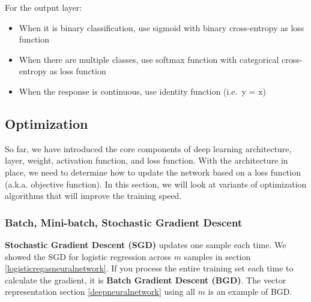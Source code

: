 \documentclass[
  12pt,
]{krantz}
\providecommand{\tightlist}{%
  \setlength{\itemsep}{0pt}\setlength{\parskip}{0pt}}
\begin{document}
For the output layer:

\begin{itemize}
\tightlist
\item
  When it is binary classification, use sigmoid with binary cross-entropy as loss function
\item
  When there are multiple classes, use softmax function with categorical cross-entropy as loss function
\item
  When the response is continuous, use identity function (i.e.~y = x)
\end{itemize}

\hypertarget{optimization}{%
\subsection{Optimization}\label{optimization}}

So far, we have introduced the core components of deep learning architecture, layer, weight, activation function, and loss function. With the architecture in place, we need to determine how to update the network based on a loss function (a.k.a. objective function). In this section, we will look at variants of optimization algorithms that will improve the training speed.

\hypertarget{batch-mini-batch-stochastic-gradient-descent}{%
\subsubsection{Batch, Mini-batch, Stochastic Gradient Descent}\label{batch-mini-batch-stochastic-gradient-descent}}

\textbf{Stochastic Gradient Descent (SGD)} updates one sample each time. We showed the SGD for logistic regression across \(m\) samples in section \ref{logisticregasneuralnetwork}. If you process the entire training set each time to calculate the gradient, it is \textbf{Batch Gradient Descent (BGD)}. The vector representation section \ref{deepneuralnetwork} using all \(m\) is an example of BGD.
\end{document}
